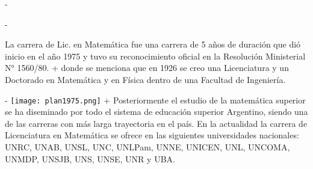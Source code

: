 -\begin{description}
- \item[Plan 1975] La carrera de Lic. en Matemática fue una carrera de 5 años de duración que dió inicio en el año 1975 y tuvo su reconocimiento oficial en la Resolución Ministerial N° 1560/80. 
+ donde se menciona que en  1926 se creo una Licenciatura y un Doctorado en Matemática y en Física dentro de una Facultad de Ingeniería. 
 
- \texttt{[image: plan1975.png]}
+ Posteriormente el estudio de la matemática superior se ha diseminado por todo el sistema de educación superior Argentino, siendo una de las carreras con más larga trayectoria en el país. En la actualidad la carrera de Licenciatura en Matemática se ofrece en las siguientes universidades nacionales: UNRC, UNAB, UNSL, UNC, UNLPam, UNNE, UNICEN, UNL, UNCOMA, UNMDP, UNSJB, UNS, UNSE, UNR y UBA.  
  

\end{description}
